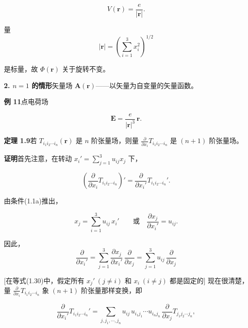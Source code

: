 \documentclass[11pt,a4paper,oneside]{ctexbook}
\newcommand{\ve}[1]{\bm{#1}}
\begin{document}
\begin{equation*}
V(\ve{r}) = \frac{e}{|\ve{r}|}.
\end{equation*}

量
\begin{equation*}
|\ve{r}| = \left(\sum_{i=1}^{3} x_i^{2}\right)^{1/2}
\end{equation*}

是标量，故 $\Phi(\ve{r})$ 关于旋转不变。

\textbf{2. $n = 1$ 的情形}\quad 矢量场 $\ve{A}(\ve{r})$——以矢量为自变量的矢量函数。

\textbf{例 11}\quad 点电荷场

\begin{equation*}
\ve{E} = \frac{e}{|\ve{r}|^{3}}\, \ve{r}.
\end{equation*}

\textbf{定理 1.9}\quad 若 $T_{i_1 i_2 \cdots i_n}(\ve{r})$ 是 $n$ 阶张量场，则量 $\frac{\partial}{\partial x_i} T_{i_1 i_2 \cdots i_n}$ 是 $(n + 1)$ 阶张量场。

\textbf{证明}\quad 首先注意，在转动 $x_i' = \sum_{j=1}^{3} u_{ij} x_j$ 下，

\begin{equation*}
\left(\frac{\partial}{\partial x_i} T_{i_1 i_2 \cdots i_n}\right)' = \frac{\partial}{\partial x_i'} T_{i_1 i_2 \cdots i_n}'.
\end{equation*}

由条件(1.1a)推出，

\begin{equation*}
x_j = \sum_{i=1}^{3} u_{ij}\, x_i' \qquad \text{或} \quad \frac{\partial x_j}{\partial x_i'} = u_{ij}.
\end{equation*}

因此，
\begin{equation}
\frac{\partial}{\partial x_i'} = \sum_{j=1}^{3} \frac{\partial x_j}{\partial x_i'}\, \frac{\partial}{\partial x_j} = \sum_{j=1}^{3} u_{ij}\, \frac{\partial}{\partial x_j}
\tag{1.30}
\end{equation}

[在等式(1.30)中，假定所有 $x_j'\ (j \neq i)$ 和 $x_i\ (i \neq j)$ 都是固定的] 现在很清楚，量 $\frac{\partial}{\partial x_i} T_{i_1 i_2 \cdots i_n}$ 象 $(n + 1)$ 阶张量那样变换，即

\begin{equation*}
\frac{\partial}{\partial x_i'} T_{i_1 i_2 \cdots i_n}' = \sum_{j, j_1, \cdots, j_n} u_{ij}\, u_{i_1 j_1} \cdots u_{i_n j_n}\, \frac{\partial}{\partial x_j} T_{j_1 j_2 \cdots j_n},
\end{equation*}
\end{document}
